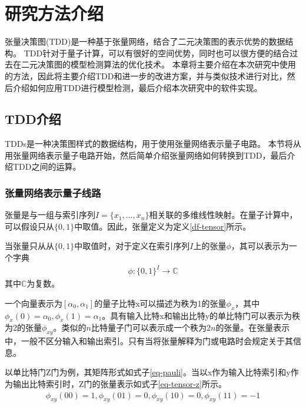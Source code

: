 \chapter{研究方法介绍}
张量决策图(TDD)是一种基于张量网络，结合了二元决策图的表示优势的数据结构。
TDD针对于量子计算，可以有很好的空间优势，同时也可以很方便的结合过去在二元决策图的模型检测算法的优化技术。
本章将主要介绍在本次研究中使用的方法，因此将主要介绍TDD和进一步的改进方案，并与类似技术进行对比，然后介绍如何应用TDD进行模型检测，最后介绍本次研究中的软件实现。
\section{TDD介绍}
TDDs是一种决策图样式的数据结构，用于使用张量网络表示量子电路。
本节将从用张量网络表示量子电路开始，然后简单介绍张量网络如何转换到TDD，最后介绍TDD之间的运算。
\subsection{张量网络表示量子线路}
张量是与一组与索引序列\(I=\{x_1,\ldots,x_n\}\)相关联的多维线性映射。在量子计算中，可以假设只从\(\{0,1\}\)中取值。因此，张量定义为定义\ref{df-tensor}所示。
\begin{definition}
    \label{df-tensor}
    当张量只从从\(\{0,1\}\)中取值时，对于定义在索引序列\(I\)上的张量\(\phi\)，其可以表示为一个字典
    \begin{align}
        \phi :{\{0,1\}}^I\rightarrow\mathbb{C}
    \end{align}
    其中\(\mathbb{C}\)为复数。
\end{definition}


一个向量表示为$[\alpha_0,\alpha_1]$的量子比特x可以描述为秩为1的张量$\phi_x$，其中$\phi_x\left(0\right)=\alpha_0, \phi_x\left(1\right)=\alpha_1$。具有输入比特x和输出比特y的单比特门可以表示为秩为2的张量$\phi_{xy}$。类似的$n$比特量子门可以表示成一个秩为$2n$的张量。在张量表示中，一般不区分输入和输出索引。只有当将张量解释为门或电路时会规定关于其信息。
\begin{example}
    以单比特门Z门为例，其矩阵形式如式子\ref{eq-pauli}。当以x作为输入比特索引和y作为输出比特索引时，Z门的张量表示如式子\ref{eq-tensor-z}所示。
    \begin{align}
        \label{eq-tensor-z}
        \phi_{xy}\left(00\right)=1,\phi_{xy}\left(01\right)=0,\phi_{xy}\left(10\right)=0,\phi_{xy}\left(11\right)=-1
    \end{align}
\end{example}

